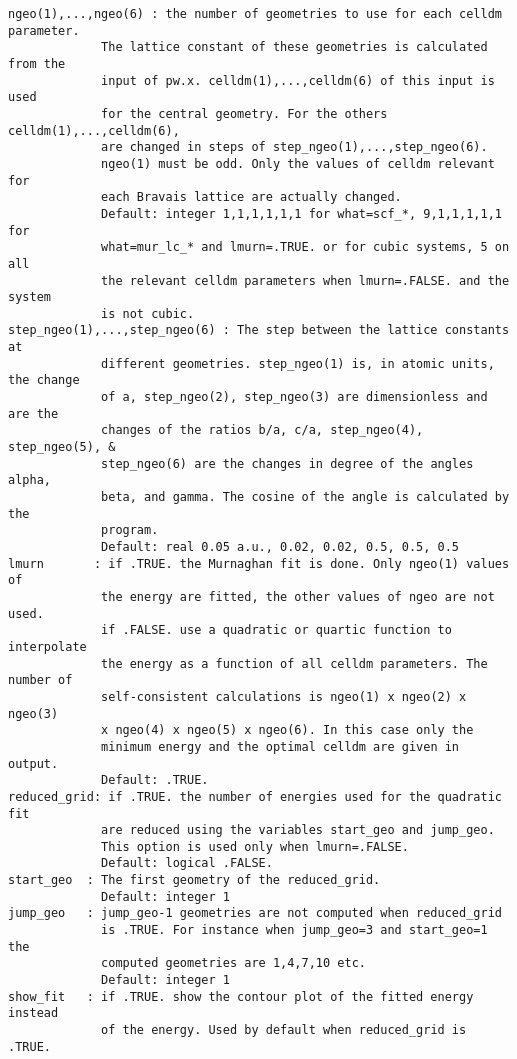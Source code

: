 \documentclass[12pt,a4paper]{article}
\begin{document}
\begin{verbatim}
ngeo(1),...,ngeo(6) : the number of geometries to use for each celldm parameter.
             The lattice constant of these geometries is calculated from the
             input of pw.x. celldm(1),...,celldm(6) of this input is used 
             for the central geometry. For the others celldm(1),...,celldm(6),
             are changed in steps of step_ngeo(1),...,step_ngeo(6). 
             ngeo(1) must be odd. Only the values of celldm relevant for
             each Bravais lattice are actually changed.
             Default: integer 1,1,1,1,1,1 for what=scf_*, 9,1,1,1,1,1 for 
             what=mur_lc_* and lmurn=.TRUE. or for cubic systems, 5 on all 
             the relevant celldm parameters when lmurn=.FALSE. and the system
             is not cubic.
step_ngeo(1),...,step_ngeo(6) : The step between the lattice constants at 
             different geometries. step_ngeo(1) is, in atomic units, the change
             of a, step_ngeo(2), step_ngeo(3) are dimensionless and are the
             changes of the ratios b/a, c/a, step_ngeo(4), step_ngeo(5), &
             step_ngeo(6) are the changes in degree of the angles alpha,
             beta, and gamma. The cosine of the angle is calculated by the
             program.
             Default: real 0.05 a.u., 0.02, 0.02, 0.5, 0.5, 0.5
lmurn       : if .TRUE. the Murnaghan fit is done. Only ngeo(1) values of
             the energy are fitted, the other values of ngeo are not used. 
             if .FALSE. use a quadratic or quartic function to interpolate 
             the energy as a function of all celldm parameters. The number of 
             self-consistent calculations is ngeo(1) x ngeo(2) x ngeo(3)
             x ngeo(4) x ngeo(5) x ngeo(6). In this case only the 
             minimum energy and the optimal celldm are given in output. 
             Default: .TRUE. 
reduced_grid: if .TRUE. the number of energies used for the quadratic fit 
             are reduced using the variables start_geo and jump_geo. 
             This option is used only when lmurn=.FALSE.
             Default: logical .FALSE.
start_geo  : The first geometry of the reduced_grid.
             Default: integer 1
jump_geo   : jump_geo-1 geometries are not computed when reduced_grid
             is .TRUE. For instance when jump_geo=3 and start_geo=1 the
             computed geometries are 1,4,7,10 etc.
             Default: integer 1
show_fit   : if .TRUE. show the contour plot of the fitted energy instead
             of the energy. Used by default when reduced_grid is .TRUE.

\end{verbatim}
\end{document}
